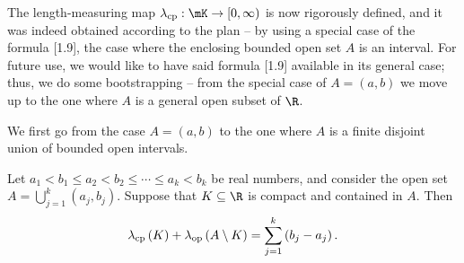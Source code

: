 \documentclass[pmath450]{subfiles}
\begin{document}
    \np The length-measuring map $\lambda_{\cp}:\mK\to\left[ 0,\infty \right)$ is now rigorously defined, and it was indeed obtained according to the plan -- by using a special case of the formula [1.9], the case where the enclosing bounded open set $A$ is an interval. For future use, we would like to have said formula [1.9] available in its general case; thus, we do some bootstrapping -- from the special case of $A=\left( a,b \right)$ we move up to the one where $A$ is a general open subset of $\R$.

    We first go from the case $A=\left( a,b \right)$ to the one where $A$ is a finite disjoint union of bounded open intervals.

    \begin{lemma}{}
        Let $a_1<b_1\leq a_2<b_2\leq\cdots\leq a_k<b_k$ be real numbers, and consider the open set $A=\bigcup^{k}_{j=1}\left( a_j,b_j \right)$. Suppose that $K\subseteq\R$ is compact and contained in $A$. Then
        \begin{equation}
            \lambda_{\operatorname{cp}}\left( K \right)+\lambda_{\operatorname{op}}\left( A\setminus K \right) = \sum^{k}_{j=1} \left( b_j-a_j \right).
        \end{equation}
    \end{lemma}
\end{document}
